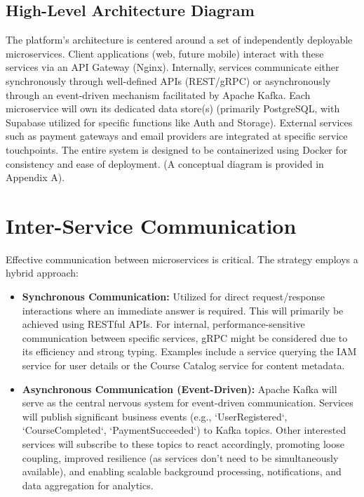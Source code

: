 \documentclass[12pt, a4paper]{report} %
\begin{document}
\begin{itemize}
  \subsection{High-Level Architecture Diagram}
    The platform's architecture is centered around a set of independently deployable microservices. Client applications (web, future mobile) interact with these services via an API Gateway (Nginx). Internally, services communicate either synchronously through well-defined APIs (REST/gRPC) or asynchronously through an event-driven mechanism facilitated by Apache Kafka. Each microservice will own its dedicated data store(s) (primarily PostgreSQL, with Supabase utilized for specific functions like Auth and Storage). External services such as payment gateways and email providers are integrated at specific service touchpoints. The entire system is designed to be containerized using Docker for consistency and ease of deployment. (A conceptual diagram is provided in Appendix A).

\section{Inter-Service Communication}
  Effective communication between microservices is critical. The strategy employs a hybrid approach:
  \begin{itemize}
    \item \textbf{Synchronous Communication:} Utilized for direct request/response interactions where an immediate answer is required. This will primarily be achieved using RESTful APIs. For internal, performance-sensitive communication between specific services, gRPC might be considered due to its efficiency and strong typing. Examples include a service querying the IAM service for user details or the Course Catalog service for content metadata.
    \item \textbf{Asynchronous Communication (Event-Driven):} Apache Kafka will serve as the central nervous system for event-driven communication. Services will publish significant business events (e.g., `UserRegistered`, `CourseCompleted`, `PaymentSucceeded`) to Kafka topics. Other interested services will subscribe to these topics to react accordingly, promoting loose coupling, improved resilience (as services don't need to be simultaneously available), and enabling scalable background processing, notifications, and data aggregation for analytics.
  \end{itemize}


\end{itemize}
\end{document}

